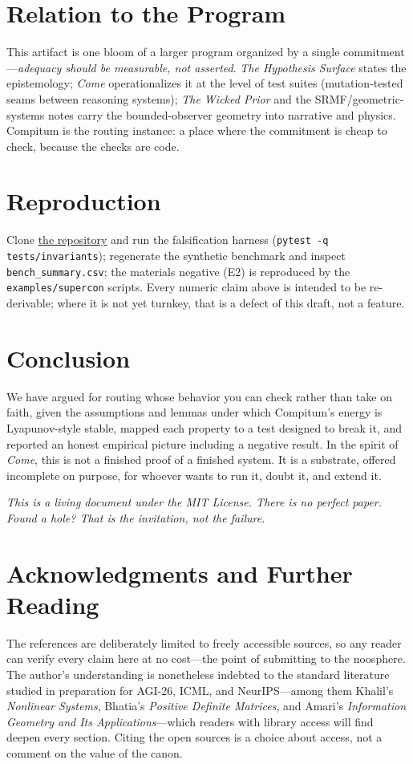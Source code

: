 \documentclass[11pt]{article}
\theoremstyle{plain}
\theoremstyle{definition}
\theoremstyle{remark}
\newcommand{\code}[1]{\texttt{#1}}
\begin{document}
\section{Relation to the Program}
This artifact is one bloom of a larger program organized by a single commitment---\emph{adequacy
should be measurable, not asserted}. \emph{The Hypothesis Surface} states the epistemology;
\emph{Come} operationalizes it at the level of test suites (mutation-tested seams between
reasoning systems); \emph{The Wicked Prior} and the SRMF/geometric-systems notes carry the
bounded-observer geometry into narrative and physics. Compitum is the routing instance: a place
where the commitment is cheap to check, because the checks are code.

\section{Reproduction}
Clone \href{https://github.com/PaulTiffany/compitum}{the repository} and run the falsification
harness (\code{pytest -q tests/invariants}); regenerate the synthetic benchmark and inspect
\code{bench\_summary.csv}; the materials negative (E2) is reproduced by the \code{examples/supercon}
scripts. Every numeric claim above is intended to be re-derivable; where it is not yet
turnkey, that is a defect of this draft, not a feature.

\section*{Conclusion}
We have argued for routing whose behavior you can check rather than take on faith, given the
assumptions and lemmas under which Compitum's energy is Lyapunov-style stable, mapped each
property to a test designed to break it, and reported an honest empirical picture including a
negative result. In the spirit of \emph{Come}, this is not a finished proof of a finished
system. It is a substrate, offered incomplete on purpose, for whoever wants to run it, doubt
it, and extend it.

\bigskip
\noindent\emph{This is a living document under the MIT License. There is no perfect paper.
Found a hole? That is the invitation, not the failure.}

\section*{Acknowledgments and Further Reading}
The references are deliberately limited to freely accessible sources, so any reader can
verify every claim here at no cost---the point of submitting to the noosphere. The author's
understanding is nonetheless indebted to the standard literature studied in preparation for
AGI-26, ICML, and NeurIPS---among them Khalil's \emph{Nonlinear Systems}, Bhatia's
\emph{Positive Definite Matrices}, and Amari's \emph{Information Geometry and Its
Applications}---which readers with library access will find deepen every section. Citing the
open sources is a choice about access, not a comment on the value of the canon.
\end{document}
